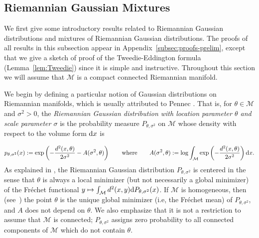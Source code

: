 \documentclass[preprint]{imsart}
\theoremstyle{plain}
\theoremstyle{definition}
\newcommand{\Mcal}{\mathcal{M}}
\newcommand{\diff}{\textnormal{d}}
\begin{document}
\subsection{Riemannian Gaussian Mixtures}\label{subsec:prelim}

We first give some introductory results related to Riemannian Gaussian distributions and mixtures of Riemannian Gaussian distributions.
The proofs of all results in this subsection appear in Appendix~\ref{subsec:proofs-prelim}, except that we give a sketch of proof of the Tweedie-Eddington formula (Lemma~\ref{lem:Tweedie}) since it is simple and instructive.
Throughout this section we will assume that $\Mcal$ is a compact connected Riemannian manifold.

We begin by defining a particular notion of Gaussian distributions on Riemannian manifolds, which is usually attributed to Pennec \cite{PennecRiemNorm}.
That is, for $\theta\in\Mcal$ and $\sigma^2>0$, the \textit{Riemannian Gaussian distribution with location parameter 
$\theta$ and scale parameter $\sigma$} is the probability measure $P_{\theta,\sigma^2}$ on $\Mcal$ whose density with respect to the volume form  $\diff x$ is 

\begin{equation}\label{eqn:ptheta}
    p_{\theta,\sigma^2}(x) := \exp\left(-\frac{d^2(x,\theta)}{2\sigma^2}-A(\sigma^2,\theta)\right) \qquad \textnormal{where}\qquad
    A(\sigma^2,\theta):=\log \int_{\Mcal}\exp\left(-\frac{d^2(x,\theta)}{2\sigma^2}\right)\diff x.
\end{equation}
As explained in \cite{PennecRiemNorm}, the Riemannian Gaussian distribution $P_{\theta,\sigma^2}$ is centered in the sense that $\theta$ is always a local minimizer (but not necessarily a global minimizer) of the Fr\'echet functional $y\mapsto \int_{\Mcal}d^2(x,y)\diff P_{\theta,\sigma^2}(x)$.
If $\Mcal$ is homogeneous, then (see~\cite[Theorem~2]{EquivariantFrechet}) the point $\theta$ is the unique global minimizer (i.e, the Fr\'echet mean) of $P_{\theta,\sigma^2}$, and $A$ does not depend on $\theta$. 
We also emphasize that it is not a restriction to assume that $\Mcal$ is connected; $P_{\theta,\sigma^2}$ assigns zero probability to all connected components of $\Mcal$ which do not contain $\theta$.
\end{document}
